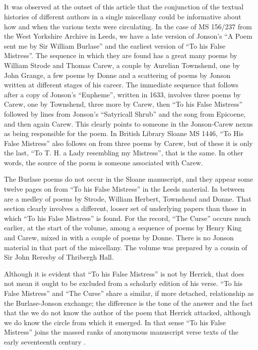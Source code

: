 \begin{paper}
\section*{}

It was observed at the outset of this article that the conjunction of
the textual histories of different authors in a single miscellany could
be informative about how and when the various texts were circulating. In
the case of MS 156/237 from the West Yorkshire Archive in Leeds, we have
a late version of Jonson's ``A Poem sent me by Sir William Burlase'' and
the earliest version of ``To his False Mistress''. The sequence in which
they are found has a great many poems by William Strode and Thomas
Carew, a couple by Aurelian Townshend, one by John Grange, a few poems
by Donne and a scattering of poems by Jonson written at different stages
of his career. The immediate sequence that follows after a copy of
Jonson's ``Eupheme'', written in 1633, involves three poems by Carew, one
by Townshend, three more by Carew, then ``To his False Mistress'' followed
by lines from Jonson's ``Satyricall Shrub'' and the song from Epicoene,
and then again Carew. This clearly points to someone in the Jonson-Carew
nexus as being responsible for the poem. In British Library Sloane MS
1446, ``To His False Mistress'' also follows on from three poems by Carew,
but of these it is only the last, ``To T. H. a Lady resembling my
Mistress'', that is the same. In other words, the source of the poem is
someone associated with Carew.

The Burlase poems do not occur in the Sloane manuscript, and they appear
some twelve pages on from ``To his False Mistress'' in the Leeds material.
In between are a medley of poems by Strode, William Herbert,
Townshend and Donne. That section clearly involves a different, looser
set of underlying papers than those in which ``To his False Mistress'' is
found. For the record, ``The Curse'' occurs much earlier, at the start of
the volume, among a sequence of poems by Henry King and Carew, mixed in
with a couple of poems by Donne. There is no Jonson material in that
part of the miscellany. The volume was prepared by a cousin of Sir John
Reresby of Thribergh Hall.

Although it is evident that ``To his False Mistress'' is not by Herrick,
that does not mean it ought to be excluded from a scholarly edition of
his verse. ``To his False Mistress'' and ``The Curse'' share a similar, if
more detached, relationship as the Burlase-Jonson exchange; the
difference is the tone of the answer and the fact that the we do not
know the author of the poem that Herrick attacked, although we do know
the circle from which it emerged. In that sense ``To his False Mistress''
joins the massed ranks of anonymous manuscript verse texts of the early
seventeenth century \citep{north_anonymous_2003}.


\end{paper}
